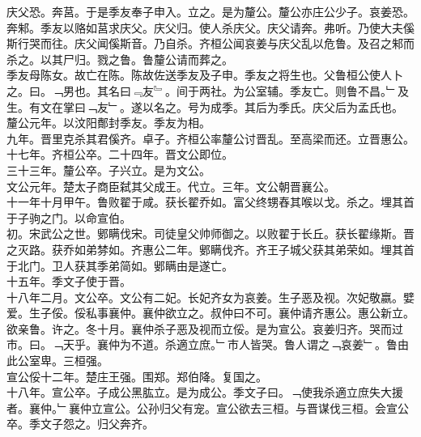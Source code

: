 \documentclass{zhvt-classic}
\begin{document}
\hspace*{2em}庆父恐。奔莒。于是季友奉子申入。立之。是为釐公。釐公亦庄公少子。哀姜恐。奔邾。季友以赂如莒求庆父。庆父归。使人杀庆父。庆父请奔。弗听。乃使大夫傒斯行哭而往。庆父闻傒斯音。乃自杀。齐桓公闻哀姜与庆父乱以危鲁。及召之邾而杀之。以其尸归。戮之鲁。鲁釐公请而葬之。\\
\hspace*{2em}季友母陈女。故亡在陈。陈故佐送季友及子申。季友之将生也。父鲁桓公使人卜之。曰。﹁男也。其名曰﹃友﹄。间于两社。为公室辅。季友亡。则鲁不昌。﹂及生。有文在掌曰﹁友﹂。遂以名之。号为成季。其后为季氏。庆父后为孟氏也。\\
\hspace*{2em}釐公元年。以汶阳鄪封季友。季友为相。\\
\hspace*{2em}九年。晋里克杀其君傒齐。卓子。齐桓公率釐公讨晋乱。至高梁而还。立晋惠公。十七年。齐桓公卒。二十四年。晋文公即位。\\
\hspace*{2em}三十三年。釐公卒。子兴立。是为文公。\\
\hspace*{2em}文公元年。楚太子商臣弑其父成王。代立。三年。文公朝晋襄公。\\
\hspace*{2em}十一年十月甲午。鲁败翟于咸。获长翟乔如。富父终甥舂其喉以戈。杀之。埋其首于子驹之门。以命宣伯。\\
\hspace*{2em}初。宋武公之世。鄋瞒伐宋。司徒皇父帅师御之。以败翟于长丘。获长翟缘斯。晋之灭路。获乔如弟棼如。齐惠公二年。鄋瞒伐齐。齐王子城父获其弟荣如。埋其首于北门。卫人获其季弟简如。鄋瞒由是遂亡。\\
\hspace*{2em}十五年。季文子使于晋。\\
\hspace*{2em}十八年二月。文公卒。文公有二妃。长妃齐女为哀姜。生子恶及视。次妃敬嬴。嬖爱。生子俀。俀私事襄仲。襄仲欲立之。叔仲曰不可。襄仲请齐惠公。惠公新立。欲亲鲁。许之。冬十月。襄仲杀子恶及视而立俀。是为宣公。哀姜归齐。哭而过市。曰。﹁天乎。襄仲为不道。杀適立庶。﹂市人皆哭。鲁人谓之﹁哀姜﹂。鲁由此公室卑。三桓强。\\
\hspace*{2em}宣公俀十二年。楚庄王强。围郑。郑伯降。复国之。\\
\hspace*{2em}十八年。宣公卒。子成公黑肱立。是为成公。季文子曰。﹁使我杀適立庶失大援者。襄仲。﹂襄仲立宣公。公孙归父有宠。宣公欲去三桓。与晋谋伐三桓。会宣公卒。季文子怨之。归父奔齐。\\
\end{document}
